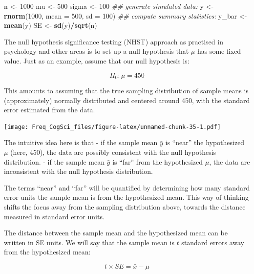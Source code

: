 \documentclass[12pt,]{krantz}
\newenvironment{Shaded}{\begin{snugshade}}{\end{snugshade}}
\newcommand{\CommentTok}[1]{\textcolor[rgb]{0.56,0.35,0.01}{\textit{#1}}}
\newcommand{\DataTypeTok}[1]{\textcolor[rgb]{0.13,0.29,0.53}{#1}}
\newcommand{\DecValTok}[1]{\textcolor[rgb]{0.00,0.00,0.81}{#1}}
\newcommand{\KeywordTok}[1]{\textcolor[rgb]{0.13,0.29,0.53}{\textbf{#1}}}
\newcommand{\NormalTok}[1]{#1}
\newcommand{\OperatorTok}[1]{\textcolor[rgb]{0.81,0.36,0.00}{\textbf{#1}}}
\newcommand{\StringTok}[1]{\textcolor[rgb]{0.31,0.60,0.02}{#1}}
\begin{document}
\begin{Shaded}
\begin{Highlighting}[]
\NormalTok{n <-}\StringTok{ }\DecValTok{1000}
\NormalTok{mu <-}\StringTok{ }\DecValTok{500}
\NormalTok{sigma <-}\StringTok{ }\DecValTok{100}
\CommentTok{## generate simulated data:}
\NormalTok{y <-}\StringTok{ }\KeywordTok{rnorm}\NormalTok{(}\DecValTok{1000}\NormalTok{, }\DataTypeTok{mean =} \DecValTok{500}\NormalTok{, }\DataTypeTok{sd =} \DecValTok{100}\NormalTok{)}
\CommentTok{## compute summary statistics:}
\NormalTok{y_bar <-}\StringTok{ }\KeywordTok{mean}\NormalTok{(y)}
\NormalTok{SE <-}\StringTok{ }\KeywordTok{sd}\NormalTok{(y)}\OperatorTok{/}\KeywordTok{sqrt}\NormalTok{(n)}
\end{Highlighting}
\end{Shaded}

The null hypothesis significance testing (NHST) approach as practised in psychology and other areas is to set up a null hypothesis that \(\mu\) has some fixed value. Just as an example, assume that our null hypothesis is:

\begin{equation}
H_0: \mu = 450
\end{equation}

This amounts to assuming that the true sampling distribution of sample means is (approximately) normally distributed and centered around 450, with the standard error estimated from the data.

\texttt{[image: Freq\_CogSci\_files/figure-latex/unnamed-chunk-35-1.pdf]}

The intuitive idea here is that
- if the sample mean \(\bar{y}\) is ``near'' the hypothesized \(\mu\) (here, 450), the data are possibly consistent with the null hypothesis distribution.
- if the sample mean \(\bar{y}\) is ``far'' from the hypothesized \(\mu\), the data are inconsistent with the null hypothesis distribution.

The terms ``near'' and ``far'' will be quantified by determining how many standard error units the sample mean is from the hypothesized mean. This way of thinking shifts the focus away from the sampling distribution above, towards the distance measured in standard error units.

The distance between the sample mean and the hypothesized mean can be written in SE units. We will say that the sample mean is \(t\) standard errors away from the hypothesized mean:

\begin{equation}
t \times SE = \bar{x} - \mu 
\end{equation}
\end{document}
